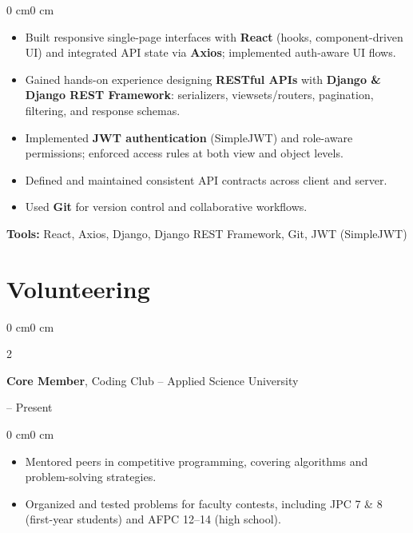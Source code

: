 \documentclass[10pt, letterpaper]{article}
\newenvironment{highlights}{
    \begin{itemize}[
        topsep=0.10 cm,
        parsep=0.10 cm,
        partopsep=0pt,
        itemsep=0pt,
        leftmargin=0 cm + 10pt
    ]
}{
    \end{itemize}
}
\newenvironment{onecolentry}{
    \begin{adjustwidth}{0 cm}{0 cm}
}{
    \end{adjustwidth}
}
\newenvironment{twocolentry}[2][]{
    \onecolentry
    \def\secondColumn{#2}
    \setcolumnwidth{\fill, 4.5 cm}
    \begin{paracol}{2}
}{
    \switchcolumn \raggedleft \secondColumn
    \end{paracol}
    \endonecolentry
}
\begin{document}
    \vspace{0.10 cm}
    \begin{onecolentry}
        \begin{highlights}
            \item Built responsive single-page interfaces with \textbf{React} (hooks, component-driven UI) and integrated API state via \textbf{Axios}; implemented auth-aware UI flows.
            \item Gained hands-on experience designing \textbf{RESTful APIs} with \textbf{Django \& Django REST Framework}: serializers, viewsets/routers, pagination, filtering, and response schemas.
            \item Implemented \textbf{JWT authentication} (SimpleJWT) and role-aware permissions; enforced access rules at both view and object levels.
            \item Defined and maintained consistent API contracts across client and server.
            \item Used \textbf{Git} for version control and collaborative workflows.
        \end{highlights}
        \textbf{Tools:} React, Axios, Django, Django REST Framework, Git, JWT (SimpleJWT)
    \end{onecolentry}

    \section{Volunteering}

        \begin{twocolentry}{
            2023 -- Present
        }
            \textbf{Core Member}, Coding Club -- Applied Science University
        \end{twocolentry}
        
        \vspace{0.10 cm}
        \begin{onecolentry}
            \begin{highlights}
                \item Mentored peers in competitive programming, covering algorithms and problem-solving strategies.
                \item Organized and tested problems for faculty contests, including JPC 7 \& 8 (first-year students) and AFPC 12--14 (high school).
            \end{highlights}
        \end{onecolentry}
\end{document}
